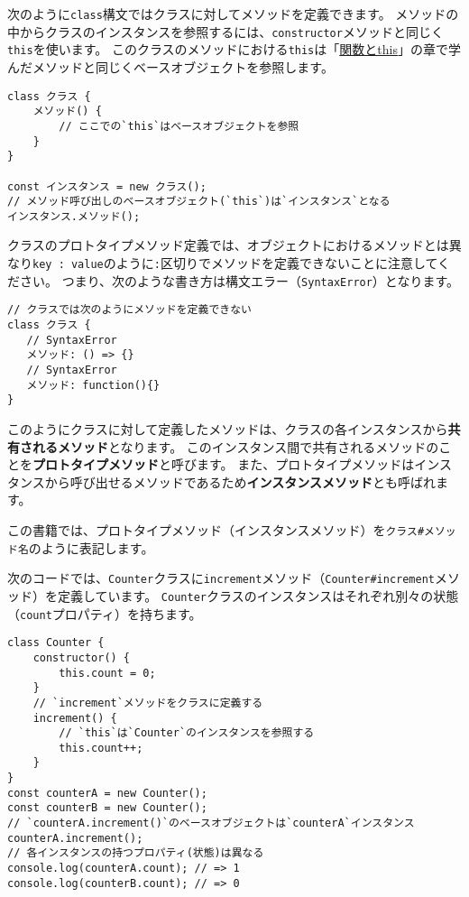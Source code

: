 次のように\texttt{class}構文ではクラスに対してメソッドを定義できます。
メソッドの中からクラスのインスタンスを参照するには、\texttt{constructor}メソッドと同じく\texttt{this}を使います。
このクラスのメソッドにおける\texttt{this}は「\href{../function-this/README.md}{関数とthis}」の章で学んだメソッドと同じくベースオブジェクトを参照します。

\begin{lstlisting}
class クラス {
    メソッド() {
        // ここでの`this`はベースオブジェクトを参照
    }
}

const インスタンス = new クラス();
// メソッド呼び出しのベースオブジェクト(`this`)は`インスタンス`となる
インスタンス.メソッド();
\end{lstlisting}

クラスのプロトタイプメソッド定義では、オブジェクトにおけるメソッドとは異なり\texttt{key : value}のように\texttt{:}区切りでメソッドを定義できないことに注意してください。
つまり、次のような書き方は構文エラー（\texttt{SyntaxError}）となります。

\begin{lstlisting}
// クラスでは次のようにメソッドを定義できない
class クラス {
   // SyntaxError
   メソッド: () => {}
   // SyntaxError
   メソッド: function(){}
}
\end{lstlisting}

このようにクラスに対して定義したメソッドは、クラスの各インスタンスから\textbf{共有されるメソッド}となります。
このインスタンス間で共有されるメソッドのことを\textbf{プロトタイプメソッド}と呼びます。
また、プロトタイプメソッドはインスタンスから呼び出せるメソッドであるため\textbf{インスタンスメソッド}とも呼ばれます。

この書籍では、プロトタイプメソッド（インスタンスメソッド）を\texttt{クラス\#メソッド名}のように表記します。

次のコードでは、\texttt{Counter}クラスに\texttt{increment}メソッド（\texttt{Counter\#increment}メソッド）を定義しています。
\texttt{Counter}クラスのインスタンスはそれぞれ別々の状態（\texttt{count}プロパティ）を持ちます。

\begin{lstlisting}
class Counter {
    constructor() {
        this.count = 0;
    }
    // `increment`メソッドをクラスに定義する
    increment() {
        // `this`は`Counter`のインスタンスを参照する
        this.count++;
    }
}
const counterA = new Counter();
const counterB = new Counter();
// `counterA.increment()`のベースオブジェクトは`counterA`インスタンス
counterA.increment();
// 各インスタンスの持つプロパティ(状態)は異なる
console.log(counterA.count); // => 1
console.log(counterB.count); // => 0
\end{lstlisting}

